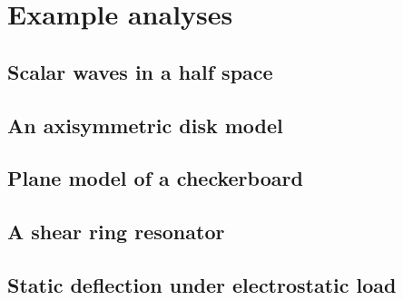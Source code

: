 \documentclass{article}
\begin{document}
\section{Example analyses}

\subsection{Scalar waves in a half space}
\subsection{An axisymmetric disk model}
\subsection{Plane model of a checkerboard}
\subsection{A shear ring resonator}
\subsection{Static deflection under electrostatic load}
\end{document}
